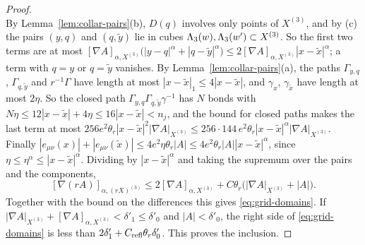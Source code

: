\begin{proof}
\[\]
By Lemma~\ref{lem:collar-pairs}(b), $D(q)$ involves only points of $X^{(3)}$, and by (c) the pairs $(y,q)$ and $(q,\tilde y)$ lie in cubes $\Lambda_3(w),\Lambda_3(w')\subset X^{(3)}$. So the first two terms are at most $[\nabla A]_{\alpha,X^{(3)}}\big(|y-q|^\alpha+|q-\tilde y|^\alpha\big)\le2[\nabla A]_{\alpha,X^{(3)}}|x-\tilde x|^\alpha$; a term with $q=y$ or $q=\tilde y$ vanishes. By Lemma~\ref{lem:collar-pairs}(a), the paths $\Gamma_{y,q}$, $\Gamma_{q,\tilde y}$ and $r^{-1}\Gamma$ have length at most $|x-\tilde x|_1\le4|x-\tilde x|$, and $\gamma_x$, $\gamma_{\tilde x}$ have length at most $2\eta$. So the closed path $\Gamma_{y,q}\Gamma_{q,\tilde y}\gamma^{-1}$ has $N$ bonds with $N\eta\le12|x-\tilde x|+4\eta\le16|x-\tilde x|<n_j$, and the bound for closed paths makes the last term at most $256e^2\theta_r|x-\tilde x|^2|\nabla A|_{X^{(3)}}\le256\cdot144\,e^2\theta_r|x-\tilde x|^\alpha|\nabla A|_{X^{(3)}}$. Finally $|e_{\mu\nu}(x)|+|e_{\mu\nu}(\tilde x)|\le4e^2\eta\theta_r|A|\le4e^2\theta_r|A||x-\tilde x|^\alpha$, since $\eta\le\eta^\alpha\le|x-\tilde x|^\alpha$. Dividing by $|x-\tilde x|^\alpha$ and taking the supremum over the pairs and the components,
\[
[\nabla(rA)]_{\alpha,(rX)^{(3)}}\le2[\nabla A]_{\alpha,X^{(3)}}+C\theta_r\big(|\nabla A|_{X^{(3)}}+|A|\big).
\]
Together with the bound on the differences this gives \eqref{eq:grid-domains}. If $|\nabla A|_{X^{(3)}}+[\nabla A]_{\alpha,X^{(3)}}<\delta'_1\le\delta'_0$ and $|A|<\delta'_0$, the right side of \eqref{eq:grid-domains} is less than $2\delta'_1+C_{\rm refl}\theta_r\delta'_0$. This proves the inclusion.
\end{proof}

